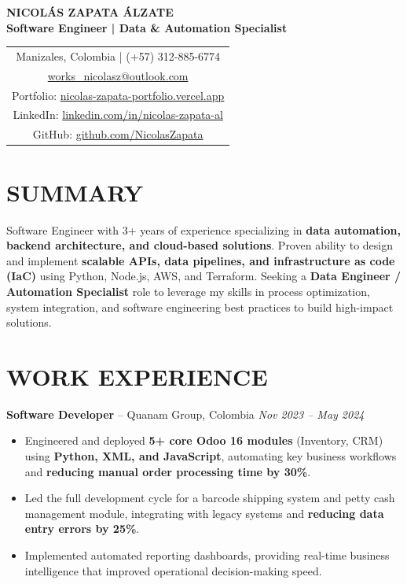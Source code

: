 \documentclass[11pt, a4paper]{article}
\begin{document}
\begin{center}
	{\Huge \textbf{NICOLÁS ZAPATA ÁLZATE}} \\
	{\large \textbf{Software Engineer | Data \& Automation Specialist}} \\[10pt]
	\begin{tabular}{@{}c@{}}
		Manizales, Colombia | (+57) 312-885-6774                                                           \\
		\href{mailto:works\_nicolasz@outlook.com}{works\_nicolasz@outlook.com}                                               \\
		Portfolio: \href{https://nicolas-zapata-portfolio.vercel.app}{nicolas-zapata-portfolio.vercel.app} \\
		LinkedIn: \href{https://linkedin.com/in/nicolas-zapata-al}{linkedin.com/in/nicolas-zapata-al}      \\
		GitHub: \href{https://github.com/NicolasZapata}{github.com/NicolasZapata}                          \\
	\end{tabular}
\end{center}

\section*{SUMMARY}
Software Engineer with 3+ years of experience specializing in \textbf{data automation, backend architecture, and cloud-based solutions}. Proven ability to design and implement \textbf{scalable APIs, data pipelines, and infrastructure as code (IaC)} using Python, Node.js, AWS, and Terraform. Seeking a \textbf{Data Engineer / Automation Specialist} role to leverage my skills in process optimization, system integration, and software engineering best practices to build high-impact solutions.

\section*{WORK EXPERIENCE}

\textbf{Software Developer} – Quanam Group, Colombia \hfill \textit{Nov 2023 – May 2024}
\begin{itemize}[leftmargin=*, nosep, topsep=4pt]
	\item Engineered and deployed \textbf{5+ core Odoo 16 modules} (Inventory, CRM) using \textbf{Python, XML, and JavaScript}, automating key business workflows and \textbf{reducing manual order processing time by 30\%}.
	\item Led the full development cycle for a barcode shipping system and petty cash management module, integrating with legacy systems and \textbf{reducing data entry errors by 25\%}.
	\item Implemented automated reporting dashboards, providing real-time business intelligence that improved operational decision-making speed.
\end{itemize}
\end{document}
